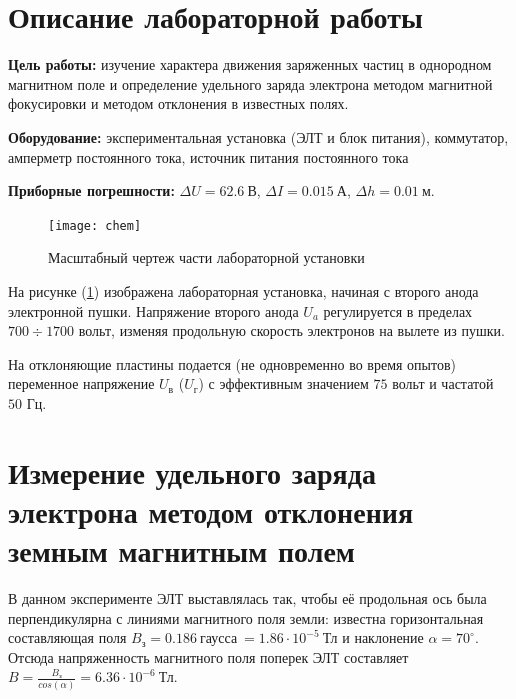\tableofcontents

% 
\newpage
\section{Описание лабораторной работы}

\textbf{Цель работы:} изучение характера движения заряженных частиц в однородном магнитном поле и определение удельного заряда электрона методом магнитной фокусировки и методом отклонения в известных полях.

\textbf{Оборудование:}
экспериментальная установка (ЭЛТ и блок питания), коммутатор, амперметр постоянного тока, источник питания постоянного тока 

\textbf{Приборные погрешности:} $\Delta{U}=62.6\ \text{В}$, $\Delta{I}=0.015\ \text{А}$, $\Delta{h}=0.01\ \text{м}$. 

\begin{figure}[ht!]
	\centering
	\texttt{[image: chem]}
	\caption{Масштабный чертеж части лабораторной установки}
	\label{fig:cxem}
\end{figure}

На рисунке (\ref{fig:cxem}) изображена лабораторная установка, начиная с второго анода электронной пушки. Напряжение второго анода $U_a$ регулируется в пределах $700\div1700$ вольт, изменяя продольную скорость электронов на вылете из пушки.

На отклоняющие пластины подается (не одновременно во время опытов) переменное напряжение $U_\text{в}$ ($U_\text{г}$) с эффективным значением $75$ вольт и частатой $50$ Гц. 








\section{Измерение удельного заряда электрона методом отклонения земным магнитным полем}

В данном эксперименте ЭЛТ выставлялась так, чтобы её продольная ось была перпендикулярна с линиями магнитного поля земли: известна горизонтальная составляющая поля  $B_\text{з}=0.186\ \text{гаусса}\ =1.86\cdot10^{-5}\ \text{Тл}$ и наклонение $\alpha=70^{\circ}$. Отсюда напряженность магнитного поля поперек ЭЛТ составляет $B=\frac{B_\text{з}}{cos(\alpha)}=6.36\cdot10^{-6}\ \text{Тл}$.

